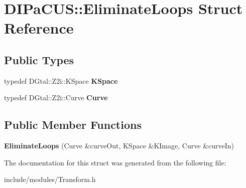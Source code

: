 \hypertarget{structDIPaCUS_1_1EliminateLoops}{}\section{D\+I\+Pa\+C\+US\+:\+:Eliminate\+Loops Struct Reference}
\label{structDIPaCUS_1_1EliminateLoops}
\subsection*{Public Types}
\begin{DoxyCompactItemize}
\item 
\mbox{\label{structDIPaCUS_1_1EliminateLoops_abcfe5f8f1ccd5c86f4a5ff07651489ae}} 
typedef D\+Gtal\+::\+Z2i\+::\+K\+Space {\bfseries K\+Space}
\item 
\mbox{\label{structDIPaCUS_1_1EliminateLoops_a752268ae75b187a2815055cf114f64c6}} 
typedef D\+Gtal\+::\+Z2i\+::\+Curve {\bfseries Curve}
\end{DoxyCompactItemize}
\subsection*{Public Member Functions}
\begin{DoxyCompactItemize}
\item 
\mbox{\label{structDIPaCUS_1_1EliminateLoops_a550b007542018f25feab2a9c2bc08e1b}} 
{\bfseries Eliminate\+Loops} (Curve \&curve\+Out, K\+Space \&K\+Image, Curve \&curve\+In)
\end{DoxyCompactItemize}


The documentation for this struct was generated from the following file\+:\begin{DoxyCompactItemize}
\item 
include/modules/Transform.\+h\end{DoxyCompactItemize}
